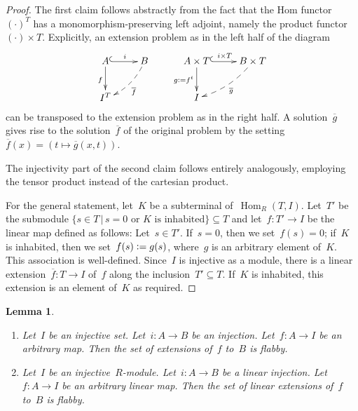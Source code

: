 \documentclass[oneside]{amsart}
\theoremstyle{definition}
\theoremstyle{plain}
\newtheorem{lemma}[defn]{Lemma}
\theoremstyle{remark}
\newcommand{\defeq}{\vcentcolon=}
\DeclareMathOperator{\Hom}{Hom}
\renewcommand{\_}{\mathpunct{.}\,}
\begin{document}
\begin{proof}The first claim follows abstractly from the fact that the Hom
functor~$(\cdot)^T$ has a monomorphism-preserving left adjoint, namely the
product functor~$(\cdot) \times T$. Explicitly, an extension problem as in the
left half of the diagram
\[
  \xymatrix{
    A \ar@{^{(}->}[r]^i\ar[d]_f & B \ar@{-->}@/^/[ld]^{\overline{f}} \\
    I^T
  }
  \qquad
  \xymatrix{
    A \times T \ar@{^{(}->}[r]^{i \times T}\ar[d]_{g \defeq f^t} & B \times T \ar@{-->}@/^/[ld]^{\overline{g}} \\
    I
  }
\]
can be transposed to the extension problem as in the right half. A
solution~$\overline{g}$ gives rise to the solution~$\overline{f}$ of the
original problem by the setting~$\overline{f}(x) = (t \mapsto
\overline{g}(x,t))$.

The injectivity part of the second claim follows entirely analogously,
employing the tensor product instead of the cartesian product.

For the general statement, let~$K$ be a subterminal of~$\Hom_R(T,I)$. Let~$T'$
be the submodule $\{ s \in T \,|\, \text{$s = 0$ or $K$ is inhabited} \}
\subseteq T$ and let~$f : T' \to I$ be the linear map defined as follows:
Let~$s \in T'$. If~$s = 0$, then we set~$f(s) = 0$; if~$K$ is inhabited, then
we set~$f(s) \defeq g(s)$, where~$g$ is an arbitrary element of~$K$. This
association is well-defined. Since~$I$ is injective as a module, there is a
linear extension~$\overline{f} : T \to I$ of~$f$ along the inclusion~$T'
\subseteq T$. If~$K$ is inhabited, this extension is an element of~$K$ as
required.
\end{proof}


\begin{lemma}\label{lemma:set-of-extensions-flabby}
\begin{enumerate}
\item Let~$I$ be an injective set. Let~$i : A \to B$ be an injection.
Let~$f : A \to I$ be an arbitrary map. Then the set of extensions of~$f$ to~$B$
is flabby.
\item Let~$I$ be an injective~$R$-module. Let~$i : A \to B$ be a linear injection.
Let~$f : A \to I$ be an arbitrary linear map. Then the set of linear extensions of~$f$ to~$B$
is flabby.
\end{enumerate}
\end{lemma}
\end{document}
